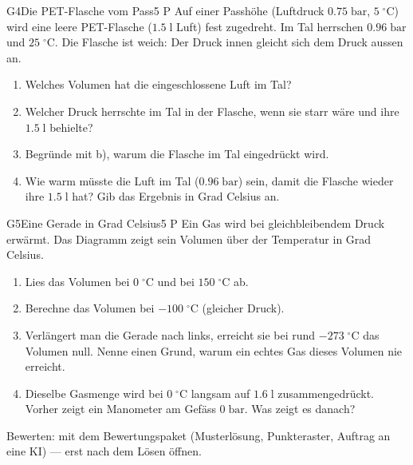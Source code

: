\documentclass[11pt]{article}
\begin{document}
\begin{lpaufgabe}{G4}{Die PET-Flasche vom Pass}{5 P}
Auf einer Passhöhe (Luftdruck \(0.75\;\text{bar}\), \(5\;^\circ\text{C}\)) wird eine leere PET-Flasche (\(1.5\;\text{l}\) Luft) fest zugedreht. Im Tal herrschen \(0.96\;\text{bar}\) und \(25\;^\circ\text{C}\). Die Flasche ist weich: Der Druck innen gleicht sich dem Druck aussen an.
\begin{enumerate}[label=\alph*),leftmargin=*,itemsep=2pt,topsep=2pt]
\item Welches Volumen hat die eingeschlossene Luft im Tal?
\item Welcher Druck herrschte im Tal in der Flasche, wenn sie starr wäre und ihre \(1.5\;\text{l}\) behielte?
\item Begründe mit b), warum die Flasche im Tal eingedrückt wird.
\item Wie warm müsste die Luft im Tal (\(0.96\;\text{bar}\)) sein, damit die Flasche wieder ihre \(1.5\;\text{l}\) hat? Gib das Ergebnis in Grad Celsius an.
\end{enumerate}
\end{lpaufgabe}

\begin{lpaufgabe}{G5}{Eine Gerade in Grad Celsius}{5 P}
Ein Gas wird bei gleichbleibendem Druck erwärmt. Das Diagramm zeigt sein Volumen über der Temperatur in Grad Celsius.\par\smallskip
\begin{center}\end{center}
\begin{enumerate}[label=\alph*),leftmargin=*,itemsep=2pt,topsep=2pt]
\item Lies das Volumen bei \(0\;^\circ\text{C}\) und bei \(150\;^\circ\text{C}\) ab.
\item Berechne das Volumen bei \(-100\;^\circ\text{C}\) (gleicher Druck).
\item Verlängert man die Gerade nach links, erreicht sie bei rund \(-273\;^\circ\text{C}\) das Volumen null. Nenne einen Grund, warum ein echtes Gas dieses Volumen nie erreicht.
\item Dieselbe Gasmenge wird bei \(0\;^\circ\text{C}\) langsam auf \(1.6\;\text{l}\) zusammengedrückt. Vorher zeigt ein Manometer am Gefäss \(0\;\text{bar}\). Was zeigt es danach?
\end{enumerate}
\end{lpaufgabe}

\vfill
{\small\color{lpgrau}Bewerten: mit dem Bewertungspaket (Musterlösung, Punkteraster, Auftrag an eine KI) — erst nach dem Lösen öffnen.}
\end{document}
